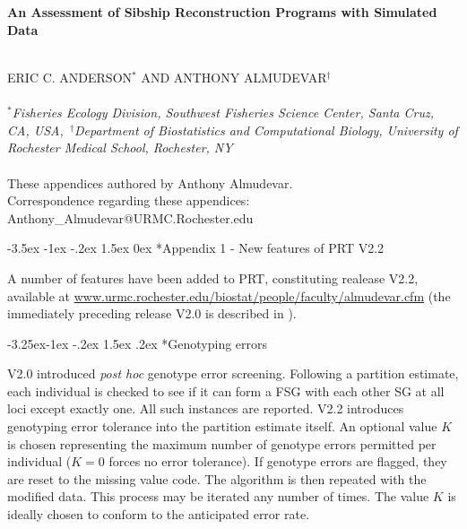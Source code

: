 \documentclass[twoside,10pt,twocolumn]{article}
\makeatletter
\renewcommand\section{\@startsection {section}{1}{\z@}%
                                   {-3.5ex \@plus -1ex \@minus -.2ex}%
                                   {1.5ex \@plus 0ex}%
                                   {\normalfont\normalsize\bfseries}}
\renewcommand\subsection{\@startsection{subsection}{2}{\z@}%
                                     {-3.25ex\@plus -1ex \@minus -.2ex}%
                                     {1.5ex \@plus .2ex}%
                                     {\normalfont\normalsize\itshape}}
\makeatother
\begin{document}
\pagestyle{fancyplain}



   \begin{strip}
   \vspace*{-.1in}
   \mbox{}\\
   \mbox{}\\
        {\LARGE\bf An Assessment of Sibship Reconstruction Programs with Simulated Data \par}
    \mbox{}\\
    \uppercase{ Eric C. Anderson$^*$ and Anthony Almudevar$^\dagger$} \\
       \mbox{}\\
    $^*${\em Fisheries Ecology Division, Southwest Fisheries Science Center, Santa Cruz, CA, 
    USA,~$^\dagger$Department of Biostatistics and Computational Biology,
		University of Rochester Medical School, Rochester, NY}\\
    \mbox{}\\
    These appendices authored by Anthony Almudevar.\\
    Correspondence regarding these appendices: Anthony\_Almudevar@URMC.Rochester.edu
\vspace*{.4in}
   \end{strip}


\section*{Appendix 1 - New features of PRT V2.2} 

A number of features have been added to PRT, constituting realease V2.2, available at  
\url{www.urmc.rochester.edu/biostat/people/faculty/almudevar.cfm}  (the immediately preceding release V2.0 
is described in \citet{alm&and11}).

\subsection*{Genotyping errors}

V2.0 introduced \emph{post hoc} genotype error screening.  Following a partition estimate, each individual 
is checked to see if it can form a FSG with each other SG at all loci except exactly one. All such instances 
are reported. V2.2 introduces genotyping error tolerance into the partition estimate itself. An optional 
value $K$ is chosen representing the maximum number of genotype errors permitted per individual ($K=0$ 
forces no error tolerance). If genotype errors are flagged, they are reset to the missing value code. The 
algorithm is then repeated with the modified data. This process may be iterated any number of times.   The 
value $K$ is ideally chosen to conform to the anticipated error rate. 
\end{document}
